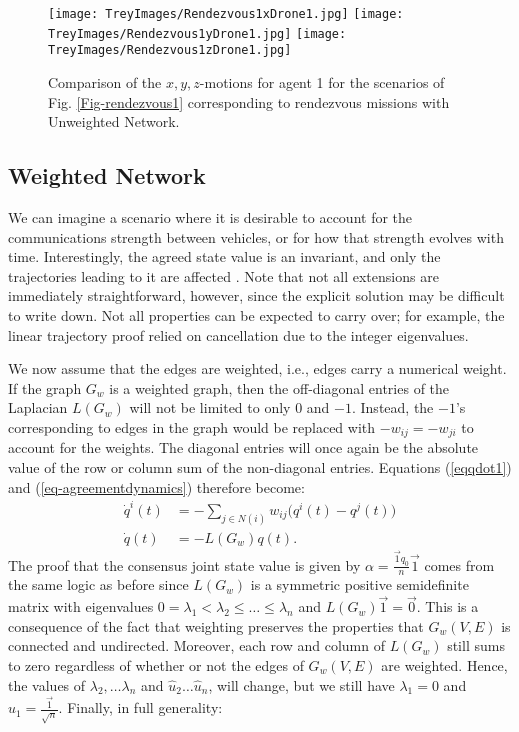 \documentclass{aims}
\theoremstyle{definition}
\begin{document}
\begin{figure}[h!]
\texttt{[image: TreyImages/Rendezvous1xDrone1.jpg]}
\texttt{[image: TreyImages/Rendezvous1yDrone1.jpg]}
\texttt{[image: TreyImages/Rendezvous1zDrone1.jpg]}
\caption{Comparison of the $x,y,z$-motions for agent 1 for the scenarios of Fig. \ref{Fig-rendezvous1} corresponding to rendezvous missions with Unweighted Network.}
\label{Fig-rendezvous1-xyz}
\end{figure}

\subsection{Weighted Network}
We can imagine a scenario where it is desirable to account for the  communications strength between vehicles, or for how that strength evolves with time. Interestingly, the agreed state value is an invariant, and only the trajectories leading to it are affected \cite{Consensus}. Note that not all extensions are immediately straightforward, however, since the explicit solution may be difficult to write down. Not all properties can be expected to carry over; for example, the linear trajectory proof relied on cancellation due to the integer eigenvalues.

We now assume that the edges are weighted, i.e., edges carry a numerical weight. If the graph $G_w$ is a weighted graph, then the off-diagonal entries of the Laplacian $L(G_w)$ will not be limited to only $0$ and $-1$. Instead, the $-1$'s corresponding to edges in the graph would be replaced with $-w_{ij}=-w_{ji}$ to account for the weights. The diagonal entries will once again be the absolute value of the row or column sum of the non-diagonal entries. Equations (\ref{eqqdot1}) and (\ref{eq-agreementdynamics}) therefore become:
\begin{align}
    \dot{q}^i(t)&=-\sum_{j\in N(i)}w_{ij}\big(q^i(t)-q^j(t)\big)\\
    \dot q(t)&=-L(G_w)q(t).
\end{align}
 The proof that the  consensus  joint  state  value is given by  $\alpha=\frac{\vec{1}q_0}{n}\vec{1}$ comes from the same logic as before since $L(G_w)$ is a symmetric positive
semidefinite matrix with eigenvalues $0=\lambda_1<\lambda_2\leq\dots\leq\lambda_n$ and $L(G_w)\vec 1=\vec 0$. This is a consequence of the fact that weighting preserves the properties that $G_w(V,E)$ is connected and undirected. Moreover, 
each row and column of $L(G_w)$ still sums to zero regardless of whether or not the edges of $G_w(V,E)$ are weighted. Hence, the values of $\lambda_2,\dots\lambda_n$ and $\hat{u}_2\dots \hat{u}_n$, will change, but we still have $\lambda_1=0$ and $\hat{u}_1=\frac{\vec{1}}{\sqrt{n}}$. Finally, in full generality:
\end{document}
